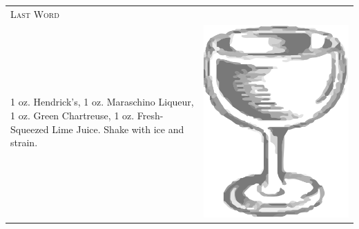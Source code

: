 \documentclass{article}
\begin{document}
\begin{multicols}{2}
\begin{tabular}{p{2in} p{0.5in}}
\multicolumn{2}{p{3in}}{\centering\Huge\textsc{Last Word}} \\ 
    \vspace{-0.1in}1 oz. Hendrick's, 1 oz. Maraschino Liqueur, 1 oz. Green Chartreuse, 1 oz. Fresh-Squeezed Lime Juice. Shake with ice and strain. &
    \vspace{-0.1in} \includegraphics{coupe.png}
\end{tabular}


\end{multicols}
\end{document}
